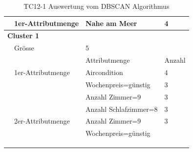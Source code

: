 \begin{longtable}{ | l | l | l | l |}
	& 1er-Attributmenge & \tabitem Nahe am Meer & 4 \\ \hline
		
	\multicolumn{4}{|l|}{\textbf{Cluster 1}} \\ \cline{2-4} 
	& Grösse & \multicolumn{2}{|l|}{5} \\ \cline{2-4} 
	&& Attributmenge & Anzahl \\ \cline{2-4} 
	
	& 1er-Attributmenge & \tabitem Aircondition & 4 \\ \cline{3-4} 
	& & \tabitem Wochenpreis=günstig & 3 \\ \cline{3-4} 
	& & \tabitem Anzahl Zimmer=9 & 3 \\ \cline{3-4} 
	& & \tabitem Anzahl Schlafzimmer=8 & 3 \\ \cline{2-4} 
	
	& 2er-Attributmenge & \tabitem Anzahl Zimmer=9 & 3 \\
	& & \tabitem Wochenpreis=günstig & \\ \hline
		
	\rowcolor{tableheadcolor}
	\multicolumn{4}{|l|}{\bfseries Testergebnis} \\ \hline 
	\multicolumn{4}{|l|}{\cellcolor{green!25}} \\ \hline 

	\caption{TC12-1 Auswertung vom DBSCAN Algorithmus}
	\centering
	\label{fig:testingfazit:testing:testcases:12:1}
\end{longtable}
